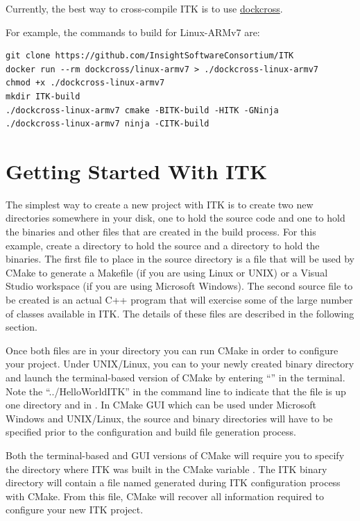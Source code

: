 Currently, the best way to cross-compile ITK is to use
\href{https://github.com/dockcross/dockcross}{dockcross}.

For example, the commands to build for Linux-ARMv7 are:

\small
\begin{verbatim}
git clone https://github.com/InsightSoftwareConsortium/ITK
docker run --rm dockcross/linux-armv7 > ./dockcross-linux-armv7
chmod +x ./dockcross-linux-armv7
mkdir ITK-build
./dockcross-linux-armv7 cmake -BITK-build -HITK -GNinja
./dockcross-linux-armv7 ninja -CITK-build
\end{verbatim}
\normalsize

\section{Getting Started With ITK}%
\label{sec:GettingStartedWithITK}

The simplest way to create a new project with ITK is to create two new
directories somewhere in your disk, one to hold the source code and one to
hold the binaries and other files that are created in the build process. For
this example, create a  directory to hold the source and a
 directory to hold the binaries. The first file to
place in the source directory is a  file that will be
used by CMake to generate a Makefile (if you are using Linux or UNIX) or a
Visual Studio workspace (if you are using Microsoft Windows). The second source
file to be created is an actual C++ program that will exercise some of the large
number of classes available in ITK. The details of these files are described in
the following section.

Once both files are in your directory you can run CMake in order to configure
your project. Under UNIX/Linux, you can  to your newly created binary
directory and launch the terminal-based version of CMake by entering
``'' in the terminal. Note the
``../HelloWorldITK'' in the command line to indicate that the
 file is up one directory and in .
In CMake GUI which can be used under Microsoft Windows and UNIX/Linux, the
source and binary directories will have to be specified prior to the
configuration and build file generation process.

Both the terminal-based and GUI versions of CMake will require you to specify
the directory where ITK was built in the CMake variable . The ITK
binary directory will contain a file named  generated
during ITK configuration process with CMake. From this file, CMake will recover
all information required to configure your new ITK project.

